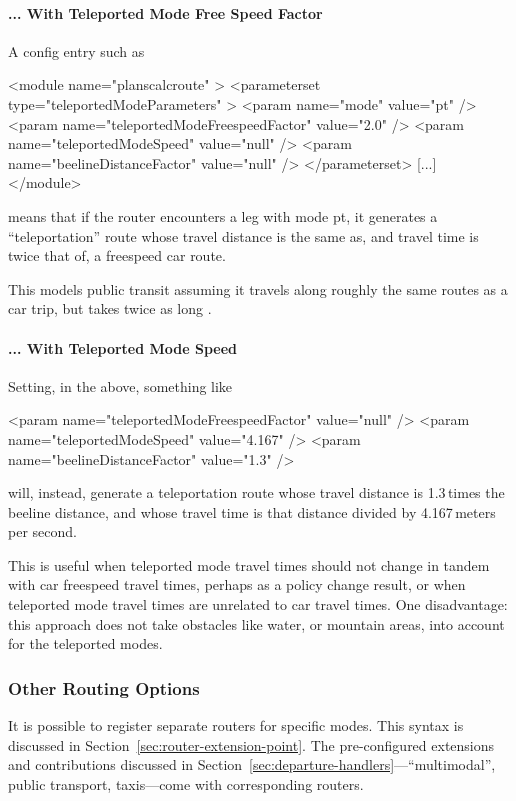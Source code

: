 \paragraph{... With Teleported Mode Free Speed Factor}
A config entry such as
\begin{xml}
<module name="planscalcroute" >
   <parameterset type="teleportedModeParameters" >
      <param name="mode" value="pt" />
      <param name="teleportedModeFreespeedFactor" value="2.0" />
      <param name="teleportedModeSpeed" value="null" />
      <param name="beelineDistanceFactor" value="null" />
   </parameterset>
   [...]   
</module>      
\end{xml}
means that if the router encounters a leg with mode pt, it generates a ``teleportation'' route whose travel distance is the same as, and  travel time is twice that of, a freespeed car route.

This models public transit assuming it travels along roughly the same routes as a car trip, but takes twice as long \citep[\cf][]{Reinhold2006Konzeptzurintegrierten}.

\paragraph{... With Teleported Mode Speed}  Setting, in the above, something like
\begin{xml}
      <param name="teleportedModeFreespeedFactor" value="null" />
      <param name="teleportedModeSpeed" value="4.167" />
      <param name="beelineDistanceFactor" value="1.3" />
\end{xml}
will, instead, generate a teleportation route whose travel distance is 1.3\,times the beeline distance, and whose travel time is that distance divided by 4.167\,meters per second.

This is useful when teleported mode travel times should not change in tandem with car freespeed travel times, perhaps as a policy change result, or when teleported mode travel times are unrelated to car travel times.  One disadvantage: this approach does not take obstacles like water, or mountain areas, into account for the teleported modes.

\subsubsection{Other Routing Options}
It is possible to register separate routers for specific modes.  This syntax is discussed in Section~\ref{sec:router-extension-point}.  The pre-configured extensions and contributions discussed in Section~\ref{sec:departure-handlers}---``multimodal'', public transport, taxis---come with corresponding routers.  

